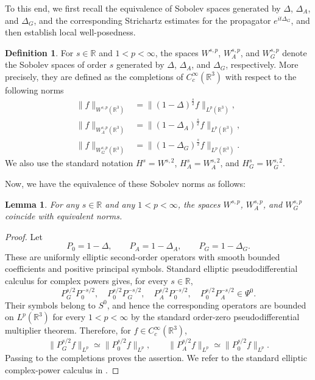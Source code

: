 \documentclass[10pt%
]{amsart}
\numberwithin{equation}{section}
\newcommand{\R}{\mathbb{R}}
\newtheorem{lemma}[theorem]{Lemma}
\theoremstyle{definition}
\newtheorem{definition}[theorem]{Definition}
\begin{document}
To this end, we first recall the equivalence of Sobolev spaces generated by $\Delta$, $\Delta_A$, and $\Delta_G$, and the corresponding Strichartz estimates for the propagator $e^{it\Delta_G}$, and then establish local well-posedness.  %


\begin{definition}
	For $s\in \R$ and $1<p<\infty$, the spaces $W^{s,p}$, $W^{s,p}_A$, and $W^{s,p}_G$ denote the Sobolev spaces of order $s$ generated by $\Delta$, $\Delta_A$, and $\Delta_G$, respectively. More precisely, they are defined as the completions of $C_c^\infty(\R^3)$ with respect to the following norms
	\begin{align*}
		\|f\|_{W^{s,p}(\R^3)} & =\|(1-\Delta)^\frac s2f\|_{L^p(\R^3)},\\
		\|f\|_{W^{s,p}_A(\R^3)} & =\|(1-\Delta_A)^\frac s2f\|_{L^p(\R^3)},\\
		\|f\|_{W^{s,p}_{G}(\R^3)} &=\|(1-\Delta_{G})^\frac{s}{2}f\|_{L^p(\R^3)}.
	\end{align*}
	We also use the standard notation $H^s=W^{s,2}$, $H_A^s=W_A^{s,2}$, and $H_G^s=W_G^{s,2}$.
\end{definition}
Now, we have the equivalence of these Sobolev norms as follows:
\begin{lemma}
	\label{lemma_2_2}
	For any $s\in \R$ and any $1<p<\infty$, the spaces $W^{s,p}$, $W_A^{s,p}$, and $W_G^{s,p}$ coincide with equivalent norms.
\end{lemma}
\begin{proof}
Let
\[
P_0=1-\Delta,\qquad P_A=1-\Delta_A,\qquad P_G=1-\Delta_G.
\]
These are uniformly elliptic second-order operators with smooth bounded coefficients and positive principal symbols. Standard elliptic pseudodifferential calculus for complex powers gives, for every $s\in\mathbb R$,
\[
P_G^{s/2}P_0^{-s/2},\quad P_0^{s/2}P_G^{-s/2},\quad
P_A^{s/2}P_0^{-s/2},\quad P_0^{s/2}P_A^{-s/2}\in\Psi^0.
\]
Their symbols belong to $S^0$, and hence the corresponding operators are bounded on $L^p(\mathbb R^3)$ for every $1<p<\infty$ by the standard order-zero pseudodifferential multiplier theorem. Therefore, for $f\in C_c^\infty(\mathbb R^3)$,
\[
\|P_G^{s/2}f\|_{L^p}\simeq\|P_0^{s/2}f\|_{L^p},
\qquad
\|P_A^{s/2}f\|_{L^p}\simeq\|P_0^{s/2}f\|_{L^p}.
\]
Passing to the completions proves the assertion. We refer to the standard elliptic complex-power calculus in \cite{Hormander,DiSj}.
\end{proof}
\end{document}
